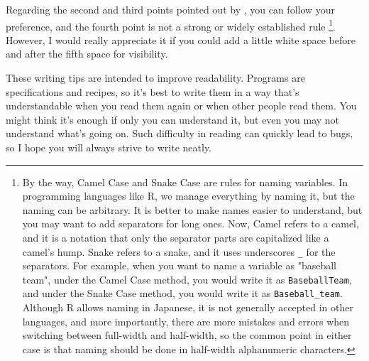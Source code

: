 \documentclass{ltjsbook}
\begin{document}
Regarding the second and third points pointed out by \textcite{Matsuura201610}, you can follow your preference, and the fourth point is not a strong or widely established rule \footnote{By the way, Camel Case and Snake Case are rules for naming variables. In programming languages like R, we manage everything by naming it, but the naming can be arbitrary. It is better to make names easier to understand, but you may want to add separators for long ones. Now, Camel refers to a camel, and it is a notation that only the separator parts are capitalized like a camel's hump. Snake refers to a snake, and it uses underscores \verb|_| for the separators. For example, when you want to name a variable as "baseball team", under the Camel Case method, you would write it as \texttt{BaseballTeam}, and under the Snake Case method, you would write it as \verb|Baseball_team|. Although R allows naming in Japanese, it is not generally accepted in other languages, and more importantly, there are more mistakes and errors when switching between full-width and half-width, so the common point in either case is that naming should be done in half-width alphanumeric characters.}. However, I would really appreciate it if you could add a little white space before and after the fifth space for visibility.

These writing tips are intended to improve readability. Programs are specifications and recipes, so it's best to write them in a way that's understandable when you read them again or when other people read them. You might think it's enough if only you can understand it, but even you may not understand what's going on. Such difficulty in reading can quickly lead to bugs, so I hope you will always strive to write neatly.
\end{document}
